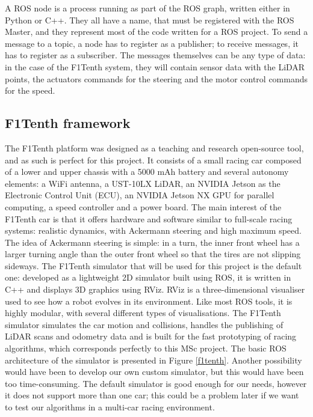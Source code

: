 A ROS node is a process running as part of the ROS graph, written either in Python or C++. They all have a name, that must be registered with the ROS Master, and they represent most of the code written for a ROS project. To send a message to a topic, a node has to register as a publisher; to receive messages, it has to register as a subscriber. The messages themselves can be any type of data: in the case of the F1Tenth system, they will contain sensor data with the LiDAR points, the actuators commands for the steering and the motor control commands for the speed.


\subsection{F1Tenth framework}

The F1Tenth platform was designed as a teaching and research open-source tool, and as such is perfect for this project. It consists of a small racing car composed of a lower and upper chassis with a 5000 mAh battery and several autonomy elements: a WiFi antenna, a UST-10LX LiDAR, an NVIDIA Jetson as the Electronic Control Unit (ECU), an NVIDIA Jetson NX GPU for parallel computing, a speed controller and a power board. \newline
The main interest of the F1Tenth car is that it offers hardware and software similar to full-scale racing systems: realistic dynamics, with Ackermann steering and high maximum speed. The idea of Ackermann steering is simple: in a turn, the inner front wheel has a larger turning angle than the outer front wheel so that the tires are not slipping sideways. \newline 
The F1Tenth simulator that will be used for this project is the default one: developed as a lightweight 2D simulator built using ROS, it is written in C++ and displays 3D graphics using RViz. RViz is a three-dimensional visualiser used to see how a robot evolves in its environment. Like most ROS tools, it is highly modular, with several different types of visualisations. The F1Tenth simulator simulates the car motion and collisions, handles the publishing of LiDAR scans and odometry data and is built for the fast prototyping of racing algorithms, which corresponds perfectly to this MSc project. The basic ROS architecture of the simulator is presented in Figure \ref{f1tenth}. Another possibility would have been to develop our own custom simulator, but this would have been too time-consuming. The default simulator is good enough for our needs, however it does not support more than one car; this could be a problem later if we want to test our algorithms in a multi-car racing environment.

